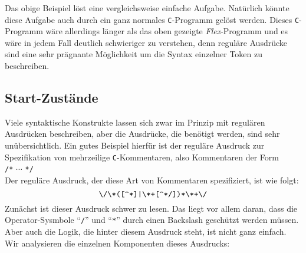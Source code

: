 Das obige Beispiel l\"ost eine vergleichsweise einfache Aufgabe.  Nat\"urlich k\"onnte diese Aufgabe
auch durch ein ganz normales \texttt{C}-Programm gel\"ost werden.  Dieses
\texttt{C}-Programm w\"are allerdings l\"anger als das oben gezeigte \textsl{Flex}-Programm
und es w\"are in jedem Fall deutlich schwieriger zu verstehen, denn regul\"are Ausdr\"ucke sind eine
sehr pr\"agnante M\"oglichkeit um die Syntax einzelner Token zu beschreiben.

\subsection{Start-Zust\"ande}
Viele syntaktische Konstrukte lassen sich zwar im Prinzip mit regul\"aren Ausdr\"ucken beschreiben,
aber die Ausdr\"ucke, die ben\"otigt werden, sind sehr un\"ubersichtlich.  Ein gutes Beispiel
hierf\"ur ist der regul\"are Ausdruck zur Spezifikation von mehrzeilige
\texttt{C}-Kommentaren, also Kommentaren der Form
\\[0.2cm]
\hspace*{1.3cm}
\texttt{/*} $\cdots$ \texttt{*/}
\\[0.2cm]
Der regul\"are Ausdruck, der diese Art von Kommentaren spezifiziert, ist wie folgt:
\begin{equation}
  \label{eq:multiline-comment}
\texttt{\symbol{92}/\symbol{92}*([\symbol{94}*]|\symbol{92}*+[\symbol{94}*/])*\symbol{92}*+\symbol{92}/}  
\end{equation}
Zun\"achst ist dieser Ausdruck schwer zu lesen.  Das liegt vor allem daran,
dass die Operator-Sysmbole ``\texttt{/}'' und ``\texttt{*}'' durch einen Backslash
gesch\"utzt werden m\"ussen.  Aber auch die Logik, die hinter diesem Ausdruck steht, ist nicht
ganz einfach.  Wir analysieren die einzelnen Komponenten dieses Ausdrucks:
